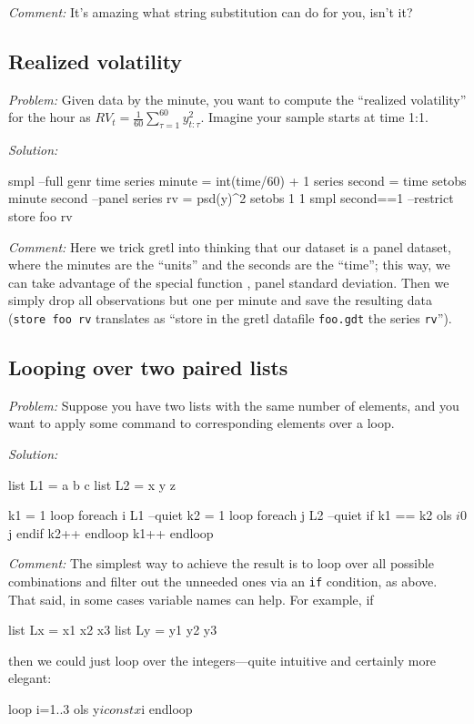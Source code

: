 
\emph{Comment:} It's amazing what string substitution can do for
you, isn't it?

\subsection{Realized volatility}

\emph{Problem:} Given data by the minute, you want to compute the
``realized volatility'' for the hour as $RV_t = 
\sum_{}^{60} y_{t:\tau}^2$. Imagine your sample starts at time 1:1.

\emph{Solution:}
\begin{code}
smpl --full
genr time
series minute = int(time/60) + 1
series second = time %
setobs minute second --panel
series rv = psd(y)^2
setobs 1 1
smpl second==1 --restrict
store foo rv
\end{code}

\emph{Comment:} Here we trick gretl into thinking that our
dataset is a panel dataset, where the minutes are the ``units'' and
the seconds are the ``time''; this way, we can take advantage of the
special function , panel standard deviation.  Then we
simply drop all observations but one per minute and save the resulting
data (\texttt{store foo rv} translates as ``store in the gretl
datafile \texttt{foo.gdt} the series \texttt{rv}'').

\subsection{Looping over two paired lists}

\emph{Problem:} Suppose you have two lists with the same number of
elements, and you want to apply some command to corresponding elements
over a loop.

\emph{Solution:}
\begin{code}
list L1 = a b c
list L2 = x y z

k1 = 1
loop foreach i L1 --quiet
    k2 = 1
    loop foreach j L2 --quiet
        if k1 == k2
            ols $i 0 $j
        endif
        k2++
    endloop
    k1++
endloop
\end{code}

\emph{Comment:} The simplest way to achieve the result is to loop over
all possible combinations and filter out the unneeded ones via an
\texttt{if} condition, as above. That said, in some cases variable
names can help. For example, if
\begin{code}
  list Lx = x1 x2 x3
  list Ly = y1 y2 y3
\end{code}
then we could just loop over the integers---quite intuitive and certainly 
more elegant:
\begin{code}
  loop i=1..3
    ols y$i const x$i
  endloop
\end{code}

